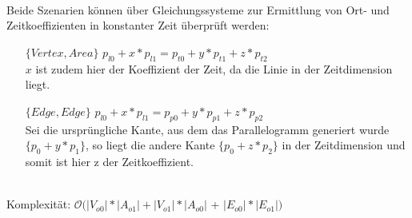 \ \\
		Beide Szenarien können über Gleichungssysteme zur Ermittlung von Ort- und Zeitkoeffizienten in konstanter Zeit überprüft werden:
		\begin{itemize}
			\item [$\{Vertex, Area\}$] $p_{l0} + x * p_{l1} = p_{t0} + y*p_{t1} + z*p_{t2}$\\
				$x$ ist zudem hier der Koeffizient der Zeit, da die Linie in der Zeitdimension liegt.
			\item [$\{Edge, Edge\}$] $p_{l0} + x * p_{l1} =  p_{p0} + y*p_{p1} + z*p_{p2}$\\
				Sei die ursprüngliche Kante, aus dem das Parallelogramm generiert wurde $\{p_0+y*p_1\}$, so liegt die andere Kante $\{p_0 + z*p_2\}$ in der Zeitdimension und somit ist hier z der Zeitkoeffizient.
		\end{itemize}
\ \\
		Komplexität: $\mathcal{O}(|V_{o0}|* |A_{o1}| + |V_{o1}|*|A_{o0}|$ + $|E_{o0}| * |E_{o1}|)$

